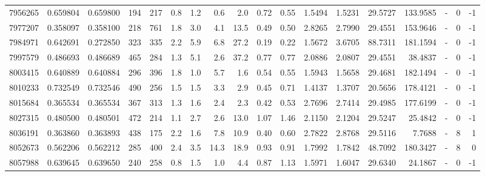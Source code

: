 \begin{tabular}{rrrrrrrrrrrrrrrlrr}
   7956265 & 0.659804 &   0.659800 &  194 &  217 &      0.8 &      1.2 &     0.6 &      2.0 &       0.72 &        0.55 &  1.5494 &  1.5231 &   29.5727 &  133.9585 &             - &        0 &         -1 \\
   7977207 & 0.358097 &   0.358100 &  218 &  761 &      1.8 &      3.0 &     4.1 &     13.5 &       0.49 &        0.50 &  2.8265 &  2.7990 &   29.4551 &  153.9646 &             - &        0 &         -1 \\
   7984971 & 0.642691 &   0.272850 &  323 &  335 &      2.2 &      5.9 &     6.8 &     27.2 &       0.19 &        0.22 &  1.5672 &  3.6705 &   88.7311 &  181.1594 &             - &        0 &         -1 \\
   7997579 & 0.486693 &   0.486689 &  465 &  284 &      1.3 &      5.1 &     2.6 &     37.2 &       0.77 &        0.77 &  2.0886 &  2.0807 &   29.4551 &   38.4837 &             - &        0 &         -1 \\
   8003415 & 0.640889 &   0.640884 &  296 &  396 &      1.8 &      1.0 &     5.7 &      1.6 &       0.54 &        0.55 &  1.5943 &  1.5658 &   29.4681 &  182.1494 &             - &        0 &         -1 \\
   8010233 & 0.732549 &   0.732546 &  490 &  256 &      1.5 &      1.5 &     3.3 &      2.9 &       0.45 &        0.71 &  1.4137 &  1.3707 &   20.5656 &  178.4121 &             - &        0 &         -1 \\
   8015684 & 0.365534 &   0.365534 &  367 &  313 &      1.3 &      1.6 &     2.4 &      2.3 &       0.42 &        0.53 &  2.7696 &  2.7414 &   29.4985 &  177.6199 &             - &        0 &         -1 \\
   8027315 & 0.480500 &   0.480501 &  472 &  214 &      1.1 &      2.7 &     2.6 &     13.0 &       1.07 &        1.46 &  2.1150 &  2.1204 &   29.5247 &   25.4842 &             - &        0 &         -1 \\
   8036191 & 0.363860 &   0.363893 &  438 &  175 &      2.2 &      1.6 &     7.8 &     10.9 &       0.40 &        0.60 &  2.7822 &  2.8768 &   29.5116 &    7.7688 &             - &        8 &          1 \\
   8052673 & 0.562206 &   0.562212 &  285 &  400 &      2.4 &      3.5 &    14.3 &     18.9 &       0.93 &        0.91 &  1.7992 &  1.7842 &   48.7092 &  180.3427 &             - &        8 &          0 \\
   8057988 & 0.639645 &   0.639650 &  240 &  258 &      0.8 &      1.5 &     1.0 &      4.4 &       0.87 &        1.13 &  1.5971 &  1.6047 &   29.6340 &   24.1867 &             - &        0 &         -1 \\

\end{tabular}
